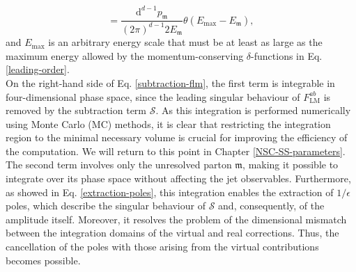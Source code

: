 \documentclass[a4paper, 12pt]{book}
\newcommand{\um}{\mathfrak{m}}
\begin{document}
\begin{equation}
    [\mathrm{d}p_{\um}] = \frac{\mathrm{d}^{d-1}p_\um}{(2 \pi)^{d-1}2E_\um} \theta(E_{\mathrm{max}}-E_\um),
    \label{measure}
\end{equation}
and $E_{\mathrm{max}}$ is an arbitrary energy scale that must be at least as large as the maximum energy allowed by the momentum-conserving $\delta$-functions in Eq. \ref{leading-order}.\\
On the right-hand side of Eq. \ref{subtraction-flm}, the first term is integrable in four-dimensional phase space, since the leading singular behaviour of $F^{ab}_{\mathrm{LM}}$ is removed by the subtraction term $\mathcal{S}$. As this integration is performed numerically using Monte Carlo (MC) methods, it is clear that restricting the integration region to the minimal necessary volume is crucial for improving the efficiency of the computation. We will return to this point in Chapter \ref{NSC-SS-parameters}.\\
The second term involves only the unresolved parton $\um$, making it possible to integrate over its phase space without affecting the jet observables. Furthermore, as showed in Eq. \ref{extraction-poles}, this integration enables the extraction of $1/\epsilon$ poles, which describe the singular behaviour of $\mathcal{S}$ and, consequently, of the amplitude itself. Moreover, it resolves the problem of the dimensional mismatch between the integration domains of the virtual and real corrections. Thus, the cancellation of the poles with those arising from the virtual contributions becomes possible.
\end{document}
